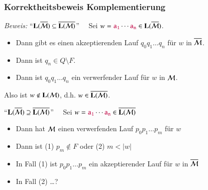 \documentclass[onlymath]{beamer}
\begin{document}
\begin{frame}\frametitle{Korrektheitsbeweis Komplementierung}

\pause

\emph{Beweis:} "`$\textbf{\textcolor{black}{L}}(\overline{\mathcal{M}}) \subseteq \overline{\textbf{\textcolor{black}{L}}(\mathcal{M})}$"'~~
Sei $w=\mathtt{\textcolor{purple}{a_1}}\cdots\mathtt{\textcolor{purple}{a_n}}\in\textbf{\textcolor{black}{L}}(\overline{\mathcal{M}})$.\pause
\begin{itemize}
\item Dann gibt es einen akzeptierenden Lauf $q_0q_1\ldots q_n$ für $w$ in $\overline{\mathcal{M}}$.\pause
\item Dann ist $q_n\in Q\setminus F$.\pause
\item Dann ist $q_0q_1\ldots q_n$ ein verwerfender Lauf für $w$ in $\mathcal{M}$.\pause
\end{itemize}
Also ist $w\notin{\textbf{\textcolor{black}{L}}(\ensuremath{\mathcal{M}})}$, d.h. $w\in\overline{\textbf{\textcolor{black}{L}}(\mathcal{M})}$.\pause
\bigskip

"`$\textbf{\textcolor{black}{L}}(\overline{\mathcal{M}}) \supseteq \overline{\textbf{\textcolor{black}{L}}(\mathcal{M})}$"'~~
Sei $w=\mathtt{\textcolor{purple}{a_1}}\cdots\mathtt{\textcolor{purple}{a_n}}\in\overline{\textbf{\textcolor{black}{L}}(\mathcal{M})}$\pause

\begin{itemize}
\item Dann hat $\mathcal{M}$ einen verwerfenden Lauf $p_0p_1\ldots p_m$ für $w$\pause
\item Dann ist (1) $p_m\notin F$ oder (2) $m<|w|$\pause
\item In Fall (1) ist $p_0p_1\ldots p_m$ ein akzeptierender Lauf für $w$ in $\overline{\mathcal{M}}$\pause
\item In Fall (2) \ldots ?\pause
\end{itemize}


\end{frame}
\end{document}
